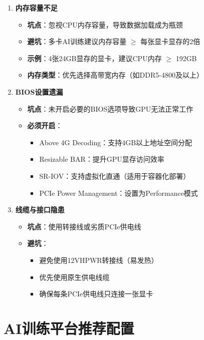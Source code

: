 \documentclass[12pt,UTF8]{ctexbook}
\begin{document}
\begin{enumerate}
    \item \textbf{内存容量不足}
    \begin{itemize}[leftmargin=2em]
        \item \textbf{坑点}：忽视CPU内存容量，导致数据加载成为瓶颈
        \item \textbf{避坑}：多卡AI训练建议内存容量 $\ge$ 每张显卡显存的2倍
        \item \textbf{示例}：4张24GB显存的显卡，建议CPU内存 $\ge$ 192GB
        \item \textbf{内存类型}：优先选择高带宽内存（如DDR5-4800及以上）
    \end{itemize}
    
    \item \textbf{BIOS设置遗漏}
    \begin{itemize}[leftmargin=2em]
        \item \textbf{坑点}：未开启必要的BIOS选项导致GPU无法正常工作
        \item \textbf{必须开启}：
        \begin{itemize}[leftmargin=2em]
            \item Above 4G Decoding：支持4GB以上地址空间分配
            \item Resizable BAR：提升GPU显存访问效率
            \item SR-IOV：支持虚拟化直通（适用于容器化部署）
            \item PCIe Power Management：设置为Performance模式
        \end{itemize}
    \end{itemize}
    
    \item \textbf{线缆与接口隐患}
    \begin{itemize}[leftmargin=2em]
        \item \textbf{坑点}：使用转接线或劣质PCIe供电线
        \item \textbf{避坑}：
        \begin{itemize}[leftmargin=2em]
            \item 避免使用12VHPWR转接线（易发热）
            \item 优先使用原生供电线缆
            \item 确保每条PCIe供电线只连接一张显卡
        \end{itemize}
    \end{itemize}
\end{enumerate}

\section{AI训练平台推荐配置}
\end{document}

